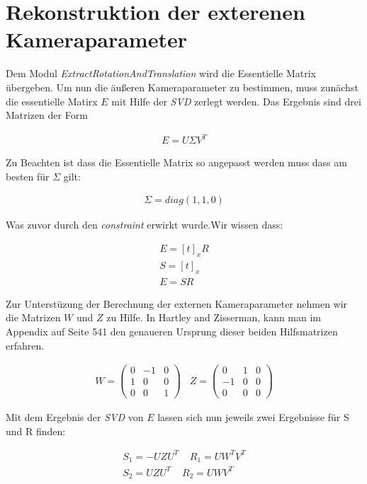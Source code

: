 \section{Rekonstruktion der exterenen Kameraparameter}
Dem Modul \textit{ExtractRotationAndTranslation} wird die Essentielle Matrix übergeben. Um nun die äußeren Kameraparameter zu bestimmen, muss zunächst die essentielle Matirx \ensuremath{E} mit Hilfe der \textit{SVD} zerlegt werden. Das Ergebnis sind drei Matrizen der Form 

\begin{gather}
E = U\Sigma V^T
\end{gather}

Zu Beachten ist dass die Essentielle Matrix so angepasst werden muss dass am besten für \ensuremath{\Sigma} gilt:

\begin{gather}
\Sigma = diag(1,1,0)
\end{gather}

Was zuvor durch den \textit{constraint} erwirkt wurde.Wir wissen dass:

\begin{gather}
E=[t]_xR\\
S =[t]_x\\
E=SR
\end{gather}

Zur Unterstüzung der Berechnung der externen Kameraparameter nehmen wir die Matrizen \ensuremath{W} und \ensuremath{Z} zu Hilfe. In Hartley and Zisserman, kann man im Appendix auf Seite 541 den genaueren Ursprung dieser beiden Hilfsmatrizen erfahren\cite{HZ}.

\begin{gather}
W = \begin{pmatrix}
0&-1&0\\
1&0&0\\
0&0&1
\end{pmatrix} \;\;\;
Z=
\begin{pmatrix}
0&1&0\\
-1&0&0\\
0&0&0
\end{pmatrix}
\end{gather}

Mit dem Ergebnis der \textit{SVD} von \ensuremath{E} lassen sich nun jeweils zwei Ergebnisse für S und R finden:	

\begin{gather}
S_1 = -UZU^T \;\;\;\; R_1 = UW^TV^T\\
S_2 = UZU^T \;\;\;\; R_2 = UWV^T
\end{gather}\\

